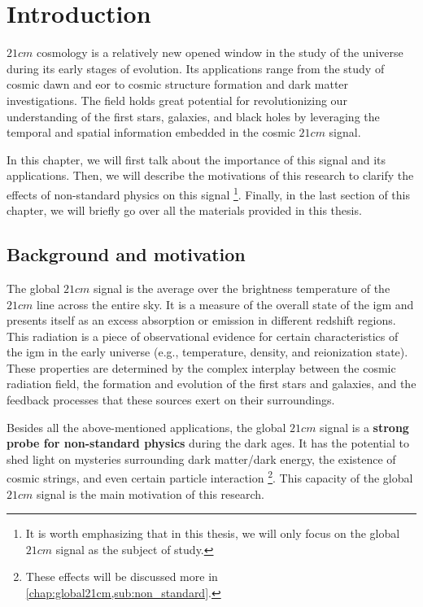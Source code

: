 \documentclass[12pt, TexShade, letterpaper]{report}
\begin{document}
 	\clearpage
	
	\glsresetall
\chapter{Introduction}
\label{chap:intro}
$21cm$ cosmology is a relatively new opened window in the study of the universe during its early stages of evolution. Its applications range from the study of cosmic dawn and \gls{eor} to cosmic structure formation and dark matter investigations\cite{SKA_dark_ages}. The field holds great potential for revolutionizing our understanding of the first stars, galaxies, and black holes by leveraging the temporal and spatial information embedded in the cosmic $21cm$ signal\cite{21cmfast_c}.\par
In this chapter, we will first talk about the importance of this signal and its applications. Then, we will describe the motivations of this research to clarify the effects of non-standard physics on this signal \footnote{It is worth emphasizing that in this thesis, we will only focus on the global $21cm$ signal as the subject of study.}. Finally, in the last section of this chapter, we will briefly go over all the materials provided in this thesis.\par
\section{Background and motivation}
The global $21cm$ signal is the average over the brightness temperature of the $21cm$ line across the entire sky. It is a measure of the overall state of the \gls{igm} and presents itself as an excess absorption or emission in different redshift regions. This radiation is a piece of observational evidence for certain characteristics of the \gls{igm} in the early universe (e.g., temperature, density, and reionization state). These properties are determined by the complex interplay between the cosmic radiation field, the formation and evolution of the first stars and galaxies, and the feedback processes that these sources exert on their surroundings\cite{21century}.\par
Besides all the above-mentioned applications, the global $21cm$ signal is a \textbf{strong probe for non-standard physics} during the dark ages. It has the potential to shed light on mysteries surrounding dark matter/dark energy, the existence of cosmic strings, and even certain particle interaction  \cite{dark_nature_21, constrain_dm_21, cosmic_string_brandenberger, ee_interaction_21, neutrino_21} \footnote{These effects will be discussed more in \ref{chap:global21cm,sub:non_standard}.}. This capacity of the global $21cm$ signal is the main motivation of this research.\par
\end{document}
